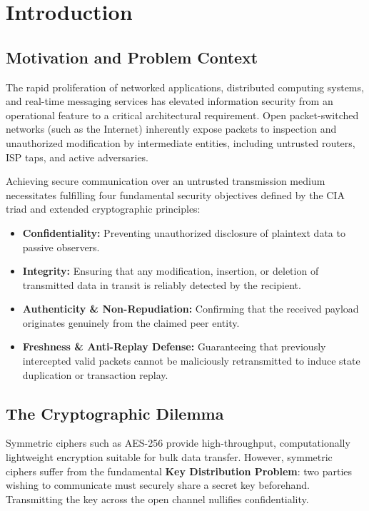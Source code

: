 \documentclass[11pt,a4paper]{article}
\begin{document}
\vspace{0.5cm}
\tableofcontents
\newpage


\section{Introduction}

\subsection{Motivation and Problem Context}
The rapid proliferation of networked applications, distributed computing systems, and real-time messaging services has elevated information security from an operational feature to a critical architectural requirement. Open packet-switched networks (such as the Internet) inherently expose packets to inspection and unauthorized modification by intermediate entities, including untrusted routers, ISP taps, and active adversaries.

Achieving secure communication over an untrusted transmission medium necessitates fulfilling four fundamental security objectives defined by the CIA triad and extended cryptographic principles:
\begin{itemize}[leftmargin=1cm]
    \item \textbf{Confidentiality:} Preventing unauthorized disclosure of plaintext data to passive observers.
    \item \textbf{Integrity:} Ensuring that any modification, insertion, or deletion of transmitted data in transit is reliably detected by the recipient.
    \item \textbf{Authenticity \& Non-Repudiation:} Confirming that the received payload originates genuinely from the claimed peer entity.
    \item \textbf{Freshness \& Anti-Replay Defense:} Guaranteeing that previously intercepted valid packets cannot be maliciously retransmitted to induce state duplication or transaction replay.
\end{itemize}

\subsection{The Cryptographic Dilemma}
Symmetric ciphers such as AES-256 provide high-throughput, computationally lightweight encryption suitable for bulk data transfer. However, symmetric ciphers suffer from the fundamental \textbf{Key Distribution Problem}: two parties wishing to communicate must securely share a secret key beforehand. Transmitting the key across the open channel nullifies confidentiality.
\end{document}
